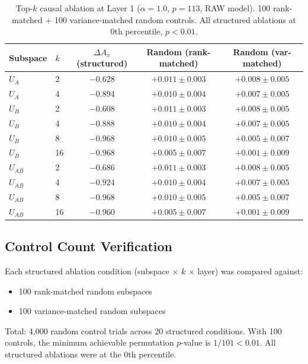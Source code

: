 \documentclass[11pt,a4paper]{article}
\begin{document}
\begin{table}[h]
\centering
\caption{Top-$k$ causal ablation at Layer 1 ($\alpha = 1.0$, $p=113$, RAW model). 100 rank-matched + 100 variance-matched random controls. All structured ablations at 0th percentile, $p < 0.01$.}
\label{tab:topk_ablation_l1}
\begin{tabular}{llccc}
\toprule
Subspace & $k$ & $\Delta A_x$ (structured) & Random (rank-matched) & Random (var-matched) \\
\midrule
$U_A$ & 2 & $-0.628$ & $+0.011 \pm 0.003$ & $+0.008 \pm 0.005$ \\
$U_A$ & 4 & $-0.894$ & $+0.010 \pm 0.004$ & $+0.007 \pm 0.005$ \\
$U_B$ & 2 & $-0.608$ & $+0.011 \pm 0.003$ & $+0.008 \pm 0.005$ \\
$U_B$ & 4 & $-0.888$ & $+0.010 \pm 0.004$ & $+0.007 \pm 0.005$ \\
$U_B$ & 8 & $-0.968$ & $+0.010 \pm 0.005$ & $+0.005 \pm 0.007$ \\
$U_B$ & 16 & $-0.968$ & $+0.005 \pm 0.007$ & $+0.001 \pm 0.009$ \\
$U_{AB}$ & 2 & $-0.686$ & $+0.011 \pm 0.003$ & $+0.008 \pm 0.005$ \\
$U_{AB}$ & 4 & $-0.924$ & $+0.010 \pm 0.004$ & $+0.007 \pm 0.005$ \\
$U_{AB}$ & 8 & $-0.968$ & $+0.010 \pm 0.005$ & $+0.005 \pm 0.007$ \\
$U_{AB}$ & 16 & $-0.960$ & $+0.005 \pm 0.007$ & $+0.001 \pm 0.009$ \\
\bottomrule
\end{tabular}
\end{table}

\subsection{Control Count Verification}

Each structured ablation condition (subspace $\times$ $k$ $\times$ layer) was compared against:
\begin{itemize}
\item 100 rank-matched random subspaces
\item 100 variance-matched random subspaces
\end{itemize}
Total: 4,000 random control trials across 20 structured conditions. With 100 controls, the minimum achievable permutation $p$-value is $1/101 < 0.01$. All structured ablations were at the 0th percentile.

\end{document}
